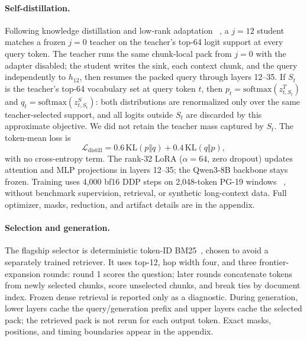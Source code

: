 \paragraph{Self-distillation.}
Following knowledge distillation and low-rank adaptation
~\citep{distillation,lora}, a $j{=}12$ student matches a frozen $j{=}0$ teacher
on the teacher's top-64 logit support at every query token. The teacher runs the
same chunk-local pack from $j{=}0$ with the adapter disabled; the student writes
the sink, each context chunk, and the query independently to $h_{12}$, then
resumes the packed query through layers 12--35. If $S_t$ is the teacher's
top-64 vocabulary set at query token $t$, then
$p_t=\mathrm{softmax}(z^T_{t,S_t})$ and
$q_t=\mathrm{softmax}(z^S_{t,S_t})$: both distributions are renormalized only
over the same teacher-selected support, and all logits outside $S_t$ are
discarded by this approximate objective. We did not retain the teacher mass
captured by $S_t$. The token-mean loss is
\begin{equation}
\mathcal L_{\mathrm{distill}}
=0.6\,\mathrm{KL}(p\Vert q)+0.4\,\mathrm{KL}(q\Vert p),
\label{eq:distill}
\end{equation}
with no cross-entropy term. The rank-32 LoRA ($\alpha{=}64$, zero dropout)
updates attention and MLP projections in layers 12--35; the Qwen3-8B backbone
stays frozen. Training uses 4,000 bf16 DDP steps on 2,048-token PG-19 windows
~\citep{pg19}, without benchmark supervision, retrieval, or synthetic
long-context data. Full optimizer, masks, reduction, and artifact details are
in the appendix.

\paragraph{Selection and generation.}
The flagship selector is deterministic token-ID BM25~\citep{bm25}, chosen to
avoid a separately trained retriever. It uses top-12, hop width four, and three
frontier-expansion rounds: round 1 scores the question; later rounds concatenate
tokens from newly selected chunks, score unselected chunks, and break ties by
document index. Frozen dense retrieval is reported only as a diagnostic. During
generation, lower layers cache the query/generation prefix and upper layers
cache the selected pack; the retrieved pack is not rerun for each output token.
Exact masks, positions, and timing boundaries appear in the appendix.
